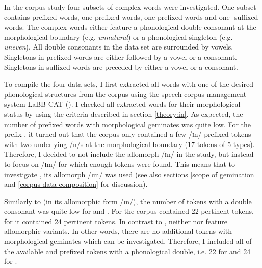 In the corpus study four subsets of complex words were investigated. One subset contains prefixed words, one prefixed words,
 one prefixed words and one -suffixed words. The complex words either feature a phonological double consonant at the morphological boundary (e.g. \textit{unnatural}) or a phonological singleton (e.g. \textit{uneven}).
All double consonants in the data set are surrounded by vowels. Singletons in prefixed words are either followed by a vowel or a consonant. Singletons in suffixed words are preceded by either a vowel or a consonant.

To compile the four data sets, I first extracted all words with one of the desired phonological structures from the corpus using the speech corpus management system LaBB-CAT (\citealt{Fromont.2012,Fromont.20032015}).  
I checked all extracted words for their morphological status by using the criteria described in section \ref{theory:in}.
As expected, the number of prefixed words with morphological geminates was quite low. 
For the prefix ,
it turned out that the corpus only contained a few /ɪn/-prefixed tokens with two underlying /n/s at the morphological boundary (17 tokens of 5 types). Therefore, I decided to not include the allomorph /ɪn/ in the study, but instead to focus on /ɪm/ for which enough tokens were found. This means that to investigate , its allomorph /ɪm/ was used (see also sections \ref{scope of gemination} and \ref{corpus data composition} for discussion).

Similarly to  (in its allomorphic form /ɪn/), the number of tokens with a double consonant was quite low for  and . For  the corpus contained 22 pertinent tokens, for  it contained 24 pertinent tokens. In contrast to , neither  nor  feature allomorphic variants. In other words, there are no additional tokens with morphological geminates which can be investigated. Therefore, I included all of the available  and prefixed tokens with a phonological double, i.e. 22 for  and 24 for . 

